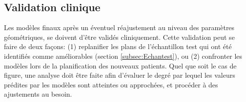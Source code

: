 \subsection{Validation clinique}
Les modèles finaux après un éventuel réajustement au niveau des paramètres géométriques, se doivent d’être validés cliniquement. Cette validation peut se faire de deux façons: (1) replanifier les plans de l’échantillon test qui ont été identifiés comme améliorables (section \ref{subsec:Echantest}), ou (2) confronter les modèles lors de la planification des nouveaux patients. Quel que soit le cas de figure, une analyse doit être faite afin d’évaluer le degré par lequel les valeurs prédites par les modèles sont atteintes ou approchées, et procéder à des ajustements au besoin.
%